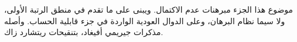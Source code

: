 \documentclass[../../include/open-logic-part]{subfiles}
\begin{document}

\begin{editorial}
 موضوع هذا الجزء مبرهنات عدم الاكتمال. ويبنى على ما تقدم في منطق
 الرتبة الأولى، ولا سيما نظام البرهان، وعلى الدوال العودية الواردة
 في جزء قابلية الحساب. وأصله مذكرات جيريمي أفيغاد، بتنقيحات ريتشارد زاك.
\end{editorial}






\OLEndPartHook
\end{document}
